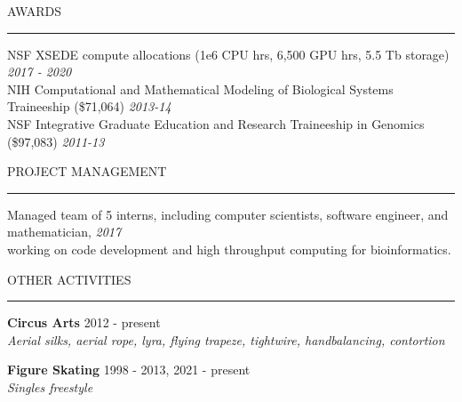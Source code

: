 \documentclass{resume} %
\renewenvironment{rSection}[1]{
\sectionskip
\textcolor{RoyalPurple}{\MakeUppercase{#1}}
\sectionlineskip
\hrule
\begin{list}{}{
\setlength{\leftmargin}{1.5em}
}
\item[]
}{
\end{list}
}
\begin{document}

\begin{rSection}{Awards}

NSF XSEDE compute allocations (1e6 CPU hrs, 6,500 GPU hrs, 5.5 Tb storage) \hfill{\em 2017 - 2020}\\
NIH Computational and Mathematical Modeling of Biological Systems Traineeship (\$71,064) \hfill {\em 2013-14}\\
NSF Integrative Graduate Education and Research Traineeship in Genomics (\$97,083) \hfill {\em 2011-13}

\end{rSection}


\begin{rSection}{Project Management}

    Managed team of 5 interns, including computer scientists, software engineer, and mathematician, \hfill {\em 2017}\\ 
    working on code development and high throughput computing for bioinformatics.
    
\end{rSection}


\begin{rSection}{Other Activities}

{\bf Circus Arts} \hfill 2012 - present \\ 
{\em Aerial silks, aerial rope, lyra, flying trapeze, tightwire, handbalancing, contortion} 

{\bf Figure Skating} \hfill 1998 - 2013, 2021 - present \\ 
{\em Singles freestyle} 

\end{rSection}
\end{document}
